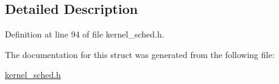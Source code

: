 \subsection{Detailed Description}


Definition at line 94 of file kernel\+\_\+sched.\+h.



The documentation for this struct was generated from the following file\+:\begin{DoxyCompactItemize}
\item 
\hyperlink{kernel__sched_8h}{kernel\+\_\+sched.\+h}\end{DoxyCompactItemize}
